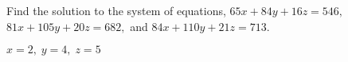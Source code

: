 
\begin{Exercise}[
name={},
title={}, 
difficulty=0,
origin={\cite{KK}}]
Find the solution to the system of equations,
$65x+84y+16z=546,$ $81x+105y+20z=682,$ and $84x+110y+21z=713.$
\end{Exercise}

\begin{Answer}
$x=2,\;y=4,\;z=5 $
\end{Answer}
